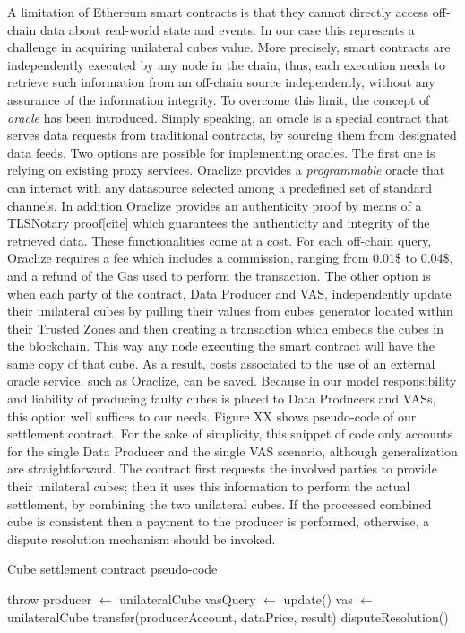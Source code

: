 A limitation of Ethereum smart contracts is that they cannot directly access off-chain data about real-world state and events. In our case this represents a challenge in acquiring unilateral cubes value. More precisely, smart contracts are independently executed by any node in the chain, thus, each execution needs to retrieve such information from an off-chain source independently, without any assurance of the information integrity.
To overcome this limit, the concept of \emph{oracle} has been introduced. Simply speaking, an oracle is a special contract that serves data requests from traditional contracts, by sourcing them from designated data feeds. 
Two options are possible for implementing oracles. The first one is relying on existing proxy services. Oraclize provides a \emph{programmable} oracle that can interact with any datasource selected among a predefined set of standard channels. In addition Oraclize provides an authenticity proof by means of a TLSNotary proof[cite] which guarantees the authenticity and integrity of the retrieved data. These functionalities come at a cost. For each off-chain query, Oraclize requires a fee which includes a commission, ranging from 0.01\$ to 0.04\$, and a refund of the Gas used to perform the transaction. 
The other option is when each party of the contract, Data Producer and VAS, independently update their unilateral cubes by pulling their values from cubes generator located within their Trusted Zones and then creating a transaction which embeds the cubes in the blockchain. This way any node executing the smart contract will have the same copy of that cube. As a result, costs associated to the use of an external oracle service, such as Oraclize, can be saved. Because in our model responsibility and liability of producing faulty cubes is placed to Data Producers and VASs, this option well suffices to our needs.
Figure XX shows pseudo-code of our settlement contract. For the sake of simplicity, this snippet of code only accounts for the single Data Producer and the single VAS scenario, although generalization are straightforward.
The contract first requests the involved parties to provide their unilateral cubes; then it uses this information to perform the actual settlement, by combining the two unilateral cubes. If the processed combined cube is consistent then a payment to the producer is performed, otherwise, a dispute resolution mechanism should be invoked.

\begin{algorithm}
	\caption{Cube settlement contract pseudo-code}\label{settlement_contract}
\begin{algorithmic}
	\STATE throw
	\STATE producer $\gets$ unilateralCube
	\STATE vasQuery $\gets$ update()
	\STATE vas $\gets$ unilateralCube
	\STATE transfer(producerAccount, dataPrice, result)
	\ELSE
	\STATE disputeResolution()
	\ENDIF
	\ENDIF
	\ENDIF
\end{algorithmic}
\end{algorithm}

